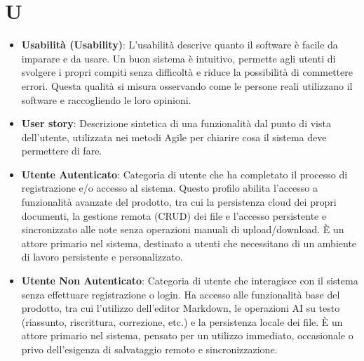 \documentclass[11pt,a4paper]{article}
\begin{document}
\newpage

\section*{U}
\begin{itemize}
\item \textbf{Usabilità (Usability)}: L’usabilità descrive quanto il software è facile da imparare e da usare. Un buon sistema è intuitivo, permette agli utenti di svolgere i propri compiti senza difficoltà e riduce la possibilità di commettere errori. Questa qualità si misura osservando come le persone reali utilizzano il software e raccogliendo le loro opinioni.

\item \textbf{User story}: Descrizione sintetica di una funzionalità dal punto di vista dell’utente, utilizzata nei metodi Agile per chiarire cosa il sistema deve permettere di fare.

\item \textbf{Utente Autenticato}: Categoria di utente che ha completato il processo di registrazione e/o accesso al sistema. Questo profilo abilita l'accesso a funzionalità avanzate del prodotto, tra cui la persistenza cloud dei propri documenti, la gestione remota (CRUD) dei file e l'accesso persistente e sincronizzato alle note senza operazioni manuali di upload/download. È un attore primario nel sistema, destinato a utenti che necessitano di un ambiente di lavoro persistente e personalizzato.

\item \textbf{Utente Non Autenticato}: Categoria di utente che interagisce con il sistema senza effettuare registrazione o login. Ha accesso alle funzionalità base del prodotto, tra cui l'utilizzo dell'editor Markdown, le operazioni AI su testo (riassunto, riscrittura, correzione, etc.) e la persistenza locale dei file. È un attore primario nel sistema, pensato per un utilizzo immediato, occasionale o privo dell'esigenza di salvataggio remoto e sincronizzazione.

\end{itemize}

\newpage
\end{document}
